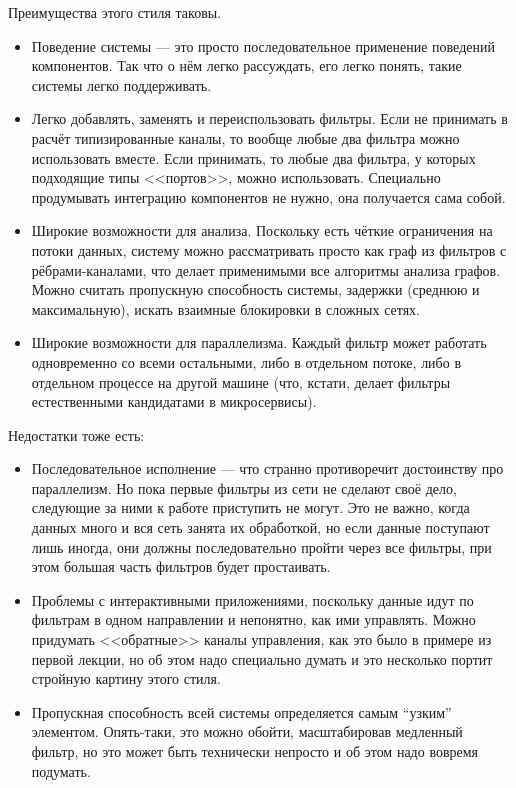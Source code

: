 \documentclass[a5paper]{article}
\begin{document}
Преимущества этого стиля таковы.

\begin{itemize}
    \item Поведение системы --- это просто последовательное применение поведений компонентов. Так что о нём легко рассуждать, его легко понять, такие системы легко поддерживать.
    \item Легко добавлять, заменять и переиспользовать фильтры. Если не принимать в расчёт типизированные каналы, то вообще любые два фильтра можно использовать вместе. Если принимать, то любые два фильтра, у которых подходящие типы <<портов>>, можно использовать. Специально продумывать интеграцию компонентов не нужно, она получается сама собой.
    \item Широкие возможности для анализа. Поскольку есть чёткие ограничения на потоки данных, систему можно рассматривать просто как граф из фильтров с рёбрами-каналами, что делает применимыми все алгоритмы анализа графов. Можно считать пропускную способность системы, задержки (среднюю и максимальную), искать взаимные блокировки в сложных сетях.
    \item Широкие возможности для параллелизма. Каждый фильтр может работать одновременно со всеми остальными, либо в отдельном потоке, либо в отдельном процессе на другой машине (что, кстати, делает фильтры естественными кандидатами в микросервисы).
\end{itemize}

Недостатки тоже есть:

\begin{itemize}
    \item Последовательное исполнение --- что странно противоречит достоинству про параллелизм. Но пока первые фильтры из сети не сделают своё дело, следующие за ними к работе приступить не могут. Это не важно, когда данных много и вся сеть занята их обработкой, но если данные поступают лишь иногда, они должны последовательно пройти через все фильтры, при этом большая часть фильтров будет простаивать.
    \item Проблемы с интерактивными приложениями, поскольку данные идут по  фильтрам в одном направлении и непонятно, как ими управлять. Можно придумать <<обратные>> каналы управления, как это было в примере из первой лекции, но об этом надо специально думать и это несколько портит стройную картину этого стиля.
    \item Пропускная способность всей системы определяется самым ``узким'' элементом. Опять-таки, это можно обойти, масштабировав медленный фильтр, но это может быть технически непросто и об этом надо вовремя подумать.
\end{itemize}
\end{document}
